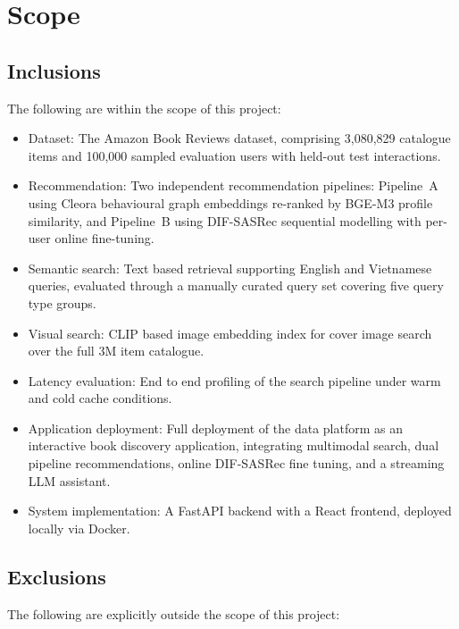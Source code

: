\section{Scope}
\label{sec:scope}

\subsection{Inclusions}

The following are within the scope of this project:

\begin{itemize}
    \item Dataset: The Amazon Book Reviews dataset, comprising 3{,}080{,}829 catalogue items and 100{,}000 sampled evaluation users with held-out test interactions.
    \item Recommendation: Two independent recommendation pipelines: Pipeline~A using Cleora behavioural graph embeddings re-ranked by BGE-M3 profile similarity, and Pipeline~B using DIF-SASRec sequential modelling with per-user online fine-tuning.
    \item Semantic search: Text based retrieval supporting English and Vietnamese queries, evaluated through a manually curated query set covering five query type groups.
    \item Visual search: CLIP based image embedding index for cover image search over the full 3M item catalogue.
    \item Latency evaluation: End to end profiling of the search pipeline under warm and cold cache conditions.
    \item Application deployment: Full deployment of the data platform as an interactive book discovery application, integrating multimodal search, dual pipeline recommendations, online DIF-SASRec fine tuning, and a streaming LLM assistant.
    \item System implementation: A FastAPI backend with a React frontend, deployed locally via Docker.
\end{itemize}

\subsection{Exclusions}

The following are explicitly outside the scope of this project:

